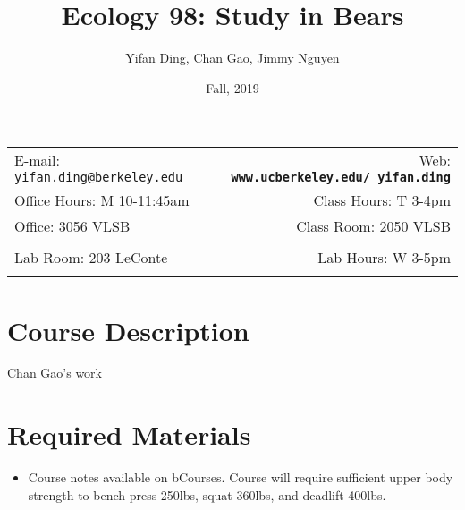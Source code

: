 \documentclass[11pt]{article}
\title{Ecology 98: Study in Bears}
\author{Yifan Ding, Chan Gao, Jimmy Nguyen}
\date{Fall, 2019}
\newcommand{\blankline}{\quad\pagebreak[2]}
\begin{document}
\maketitle

\blankline

\begin{tabular*}{.93\textwidth}{@{\extracolsep{\fill}}lr}


E-mail: \texttt{yifan.ding@berkeley.edu} & Web: \href{www.ucberkeley.edu/~yifan.ding}{\tt\bf www.ucberkeley.edu/~yifan.ding}  \\

 Office Hours: M 10-11:45am  &  Class Hours: T 3-4pm \\

 Office: 3056 VLSB & Class Room: 2050 VLSB \\
 & \\
Lab Room: 203 LeConte & Lab Hours: W 3-5pm \\
&  \\
\hline
\end{tabular*}

\vspace{5 mm}


\section*{Course Description}

Chan Gao's work


\section*{Required Materials}

\begin{itemize}
\item Course notes available on bCourses. Course will require sufficient upper body strength to bench press 250lbs, squat 360lbs, and deadlift 400lbs. 
\end{itemize}


\end{document}
